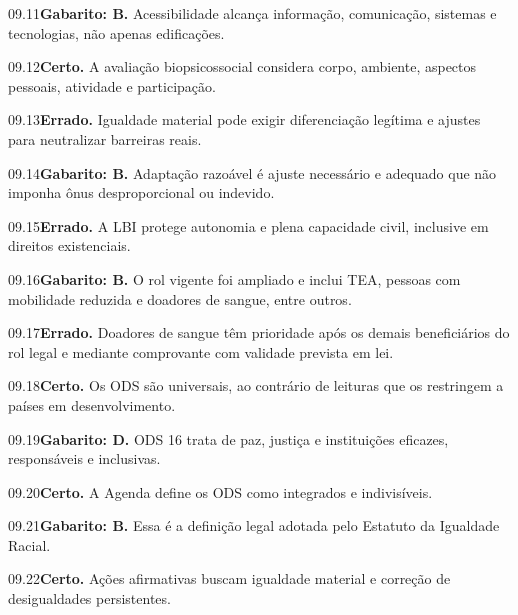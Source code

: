 \begin{solucao}{09.11}\textbf{Gabarito: B.} Acessibilidade alcança informação, comunicação, sistemas e tecnologias, não apenas edificações.\end{solucao}
\begin{solucao}{09.12}\textbf{Certo.} A avaliação biopsicossocial considera corpo, ambiente, aspectos pessoais, atividade e participação.\end{solucao}
\begin{solucao}{09.13}\textbf{Errado.} Igualdade material pode exigir diferenciação legítima e ajustes para neutralizar barreiras reais.\end{solucao}
\begin{solucao}{09.14}\textbf{Gabarito: B.} Adaptação razoável é ajuste necessário e adequado que não imponha ônus desproporcional ou indevido.\end{solucao}
\begin{solucao}{09.15}\textbf{Errado.} A LBI protege autonomia e plena capacidade civil, inclusive em direitos existenciais.\end{solucao}
\begin{solucao}{09.16}\textbf{Gabarito: B.} O rol vigente foi ampliado e inclui TEA, pessoas com mobilidade reduzida e doadores de sangue, entre outros.\end{solucao}
\begin{solucao}{09.17}\textbf{Errado.} Doadores de sangue têm prioridade após os demais beneficiários do rol legal e mediante comprovante com validade prevista em lei.\end{solucao}
\begin{solucao}{09.18}\textbf{Certo.} Os ODS são universais, ao contrário de leituras que os restringem a países em desenvolvimento.\end{solucao}
\begin{solucao}{09.19}\textbf{Gabarito: D.} ODS 16 trata de paz, justiça e instituições eficazes, responsáveis e inclusivas.\end{solucao}
\begin{solucao}{09.20}\textbf{Certo.} A Agenda define os ODS como integrados e indivisíveis.\end{solucao}
\begin{solucao}{09.21}\textbf{Gabarito: B.} Essa é a definição legal adotada pelo Estatuto da Igualdade Racial.\end{solucao}
\begin{solucao}{09.22}\textbf{Certo.} Ações afirmativas buscam igualdade material e correção de desigualdades persistentes.\end{solucao}
